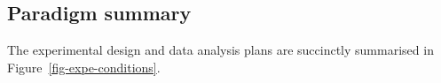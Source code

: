 \documentclass[
  authoryear]{elsarticle}
\begin{document}
\subsection{Paradigm summary}\label{paradigm-summary}

The experimental design and data analysis plans are succinctly
summarised in Figure~\ref{fig-expe-conditions}.

\begin{figure}

\begin{minipage}{0.50\linewidth}

\end{minipage}
\end{figure}
\end{document}
